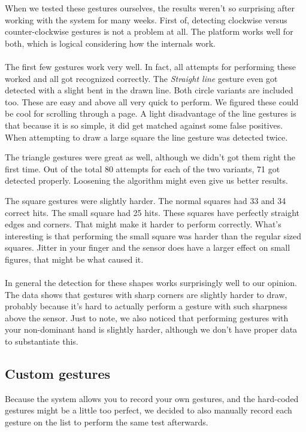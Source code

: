 \documentclass[a4paper]{article}
\begin{document}
  When we tested these gestures ourselves, the results weren't so surprising
  after working with the system for many weeks. First of, detecting clockwise
  versus counter-clockwise gestures is not a problem at all. The platform works
  well for both, which is logical considering how the internals work.

  \paragraph{}
  The first few gestures work very well. In fact, all attempts for performing
  these worked and all got recognized correctly. The \emph{Straight line}
  gesture even got detected with a slight bent in the drawn line. Both circle
  variants are included too. These are easy and above all very quick to perform.
  We figured these could be cool for scrolling through a page.
  A light disadvantage of the line gestures is that because it is so simple, it
  did get matched against some false positives. When attempting to draw a large
  square the line gesture was detected twice.

  The triangle gestures were great as well, although we didn't got them right
  the first time. Out of the total 80 attempts for each of the two variants, 71
  got detected properly. Loosening the algorithm might even give us better
  results.

  The square gestures were slightly harder. The normal squares had 33 and 34
  correct hits. The small square had 25 hits. These squares have perfectly
  straight edges and corners. That might make it harder to perform correctly.
  What's interesting is that performing the small square was harder than the
  regular sized squares. Jitter in your finger and the sensor does have a larger
  effect on small figures, that might be what caused it.

  \paragraph{}
  In general the detection for these shapes works surprisingly well to our
  opinion. The data shows that gestures with sharp corners are slightly harder
  to draw, probably because it's hard to actually perform a gesture with such
  sharpness above the sensor. Just to note, we also noticed that performing
  gestures with your non-dominant hand is slightly harder, although we don't
  have proper data to substantiate this.

  \subsection*{Custom gestures}
  Because the system allows you to record your own gestures, and the hard-coded
  gestures might be a little too perfect, we decided to also manually record
  each gesture on the list to perform the same test afterwards.
\end{document}
